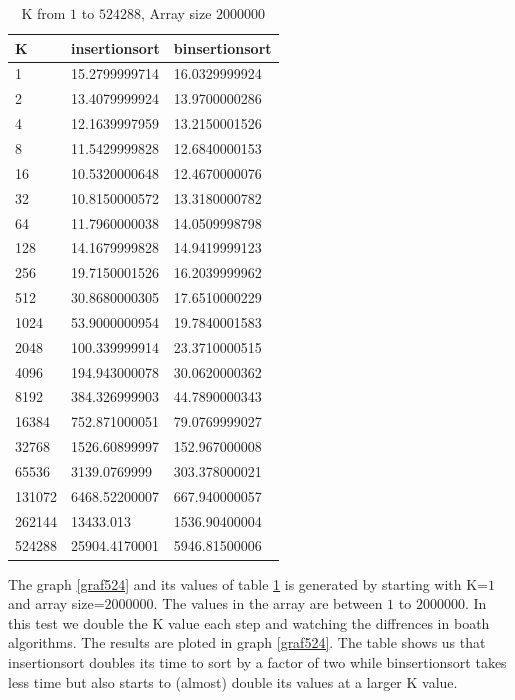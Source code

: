 \documentclass[paper=a4, fontsize=11pt]{scrartcl}
\numberwithin{equation}{section}		%
\numberwithin{figure}{section}			%
\numberwithin{table}{section}				%
\begin{document}
\begin{table}[H]
\begin{center}
\begin{tabular}{|l|l|l|}	
    \hline
    K				& insertionsort   & binsertionsort \\ \hline
    1				& 15.2799999714   & 16.0329999924 \\
    2				& 13.4079999924   & 13.9700000286 \\
    4				& 12.1639997959   & 13.2150001526 \\
    8				& 11.5429999828   & 12.6840000153 \\
    16				& 10.5320000648   & 12.4670000076 \\
    32				& 10.8150000572   & 13.3180000782 \\
    64				& 11.7960000038   & 14.0509998798 \\
    128				& 14.1679999828   & 14.9419999123 \\
    256				& 19.7150001526   & 16.2039999962 \\
    512				& 30.8680000305   & 17.6510000229 \\
    1024			& 53.9000000954   & 19.7840001583 \\
    2048			& 100.339999914   & 23.3710000515 \\
    4096			& 194.943000078   & 30.0620000362 \\ 
    8192			& 384.326999903   & 44.7890000343 \\
    16384			& 752.871000051   & 79.0769999027 \\ 
    32768			& 1526.60899997   & 152.967000008 \\ 
    65536			& 3139.0769999    & 303.378000021 \\
	131072			& 6468.52200007   & 667.940000057 \\
	262144			& 13433.013       & 1536.90400004 \\
	524288			& 25904.4170001   & 5946.81500006 \\
    \hline
\end{tabular}
\end{center}
\caption{K from $1$ to $524 288$, Array size $2 000 000$}
\label{table01}
\end{table}

The graph \ref{graf524} and its values of table \ref{table01} is generated by starting with K=$1$ and array size=$2 000 000$. The values in the array are between $1$ to $2 000 000$. In this test we double the K value each step and watching the diffrences in boath algorithms. The results are ploted in graph \ref{graf524}.
The table shows us that insertionsort doubles its time to sort by a factor of two while binsertionsort takes less time but also starts to (almost) double its values at a larger K value.
\end{document}
